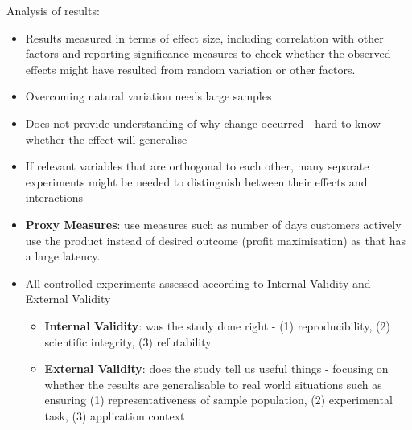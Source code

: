 \documentclass{article}
\newenvironment{cons}{\par\color{red}}{\par}
\begin{document}
\noindent
Analysis of results:
\begin{itemize}
    \item Results measured in terms of effect size, including correlation with other factors and reporting significance measures to check whether the observed effects might have resulted from random variation or other factors.
    \begin{cons}
    \item Overcoming natural variation needs large samples
    \item Does not provide understanding of why change occurred - hard to know whether the effect will generalise
    \item If relevant variables that are orthogonal to each other, many separate experiments might be needed to distinguish between their effects and interactions
    \end{cons}
    \item \textbf{Proxy Measures}: use measures such as number of days customers actively use the product instead of desired outcome (profit maximisation) as that has a large latency.
    \item All controlled experiments assessed according to Internal Validity and External Validity
    \begin{itemize}
        \item \textbf{Internal Validity}: was the study done right - (1) reproducibility, (2) scientific integrity, (3) refutability
        \item \textbf{External Validity}: does the study tell us useful things - focusing on whether the results are generalisable to real world situations such as ensuring (1) representativeness of sample population, (2) experimental task, (3) application context
    \end{itemize}
\end{itemize}
\end{document}
